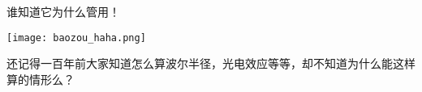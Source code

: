 \documentclass[CJK]{beamer}
\begin{document}
\begin{frame}
\bch
\begin{minipage}{0.6\textwidth}
谁知道它为什么管用！
\end{minipage}
\begin{minipage}{0.3\textwidth}
\texttt{[image: baozou\_haha.png]}
\end{minipage}

\skipline
\skipline
\skipline
\skipline
还记得一百年前大家知道怎么算波尔半径，光电效应等等，却不知道为什么能这样算的情形么？
\ech
\end{frame}











\end{document}
